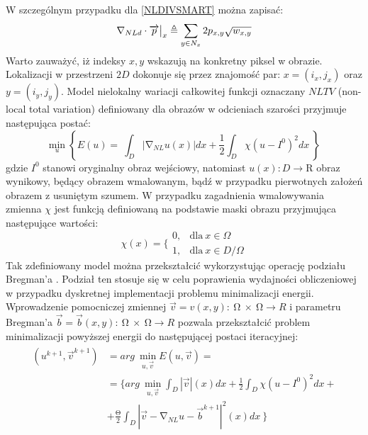 \documentclass[12pt, twoside, openany]{report}
\theoremstyle{definition}
\begin{document}
W szczególnym przypadku dla \eqref{NLDIVSMART} można zapisać:
\begin{equation}
{\mathrm{\nabla }}_{NLd}\cdot \overrightarrow{p}\big|_x \triangleq \sum_{ 
y\in N_x \\ 
}{2p_{x,y}}\sqrt{w_{x,y}}
\label{DNLDIVSMART}
\end{equation}
Warto zauważyć, iż indeksy $x,y$ wskazują na konkretny piksel w obrazie. Lokalizacji w przestrzeni $2D$ dokonuje się przez znajomość par: $x=(i_x,j_x)$ oraz $y=(i_y,j_y)$.
Model nielokalny wariacji całkowitej funkcji oznaczany $NLTV$ (non-local total variation) definiowany dla obrazów w odcieniach szarości przyjmuje następująca postać:
\begin{equation}
{\mathop{\mathrm{min}}_{u} \left\{E\left(u\right)=\ \int_D{\left|{\mathrm{\nabla }}_{NL}u(x)\right|}dx+\frac{1}{2}\int_D{\chi{\left(u-I^0\right)}^2}dx\ \right\}\ }
\label{NLTVGRAY}
\end{equation}
gdzie $I^0$ stanowi oryginalny obraz wejściowy, natomiast $u\left(x\right):D\mathrm{\longrightarrow }\mathrm{R}$ obraz wynikowy, będący obrazem wmalowanym, bądź w przypadku pierwotnych założeń obrazem z usuniętym szumem. W przypadku zagadnienia wmalowywania zmienna ${\chi }$ jest funkcją definiowaną na podstawie maski obrazu przyjmująca następujące wartości:
\begin{equation}
\chi \left(x\right)=\Bigg\{ \begin{array}{ll}
0, & \text{dla} \ x \in \Omega \\ 
1, & \text{dla} \ x \in D/ \Omega \end{array}
\label{maskFunction}
\end{equation}
Tak zdefiniowany model można przekształcić wykorzystując operację podziału Bregman’a \cite{bresson2009short}. Podział ten stosuje się w celu poprawienia wydajności obliczeniowej w przypadku dyskretnej implementacji problemu minimalizacji energii. Wprowadzenie pomocniczej zmiennej $\overrightarrow{v}=v\left(x,y\right):\ \mathrm{\Omega }\mathrm{\ } \times \ \mathrm{\Omega }\longrightarrow R$ i parametru Bregman’a $\overrightarrow{b}=\overrightarrow{b}\left(x,y\right):\ \mathrm{\Omega }\mathrm{\ }\times \ \mathrm{\Omega }\longrightarrow R$ pozwala przekształcić problem minimalizacji powyższej energii do następującej postaci iteracyjnej:
\begin{align}
\begin{aligned}
\left(u^{k+1},{\overrightarrow{v}}^{k+1}\right) &= arg\ \mathop{\mathrm{min}}_{u,\overrightarrow{v}} E\left(u,\overrightarrow{v}\right)=\\ 
&= \biggl\{arg\ \mathop{\mathrm{min}}_{u,\overrightarrow{v}}
\int_D{|\overrightarrow{v}|\left(x\right)}dx+\frac{1}{2}\int_D{{\chi }{\left(u-I^0\right)}^2}dx+\\
&+  \frac{\mathrm{\Theta }}{2}\int_D{{\left|\overrightarrow{v}-{\mathrm{\nabla }}_{NL}u-{\overrightarrow{b}}^{k+1}\right|}^2(x)}dx\ \biggr\}
\end{aligned}
\label{NLTVGRAYMINPROB}
\end{align}
\end{document}
